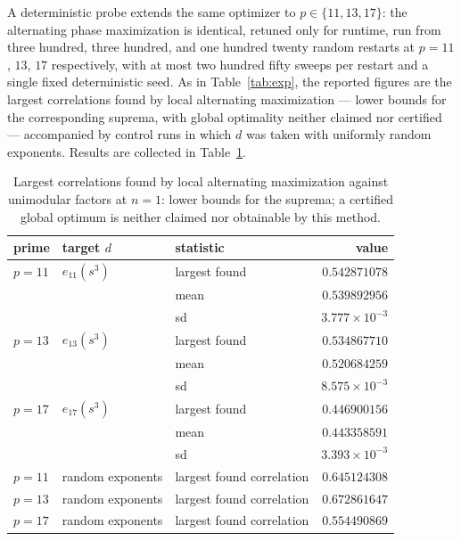 \documentclass[11pt]{article}
\theoremstyle{remark}
\begin{document}
A deterministic probe extends the same optimizer to $p\in\{11,13,17\}$: the
alternating phase maximization is identical, retuned only for runtime, run
from three hundred, three hundred, and one hundred twenty random restarts at
$p=11$, $13$, $17$ respectively, with at most two hundred fifty sweeps per
restart and a single fixed deterministic seed. As in Table~\ref{tab:exp},
the reported figures are the largest correlations found by local alternating
maximization — lower bounds for the corresponding suprema, with global
optimality neither claimed nor certified — accompanied by control runs in
which $d$ was taken with uniformly random exponents. Results are collected
in Table~\ref{tab:probe}.

\begin{table}[ht]
\centering
\small
\begin{tabular}{lllr}
\toprule
prime & target $d$ & statistic & value \\
\midrule
$p=11$ & $e_{11}(s^{3})$ & largest found & $0.542871078$ \\
       &                 & mean          & $0.539892956$ \\
       &                 & sd            & $3.777\times10^{-3}$ \\
$p=13$ & $e_{13}(s^{3})$ & largest found & $0.534867710$ \\
       &                 & mean          & $0.520684259$ \\
       &                 & sd            & $8.575\times10^{-3}$ \\
$p=17$ & $e_{17}(s^{3})$ & largest found & $0.446900156$ \\
       &                 & mean          & $0.443358591$ \\
       &                 & sd            & $3.393\times10^{-3}$ \\
\midrule
$p=11$ & random exponents & largest found correlation & $0.645124308$ \\
$p=13$ & random exponents & largest found correlation & $0.672861647$ \\
$p=17$ & random exponents & largest found correlation & $0.554490869$ \\
\bottomrule
\end{tabular}
\caption{Largest correlations found by local alternating maximization against
unimodular factors at $n=1$: lower bounds for the suprema; a certified global
optimum is neither claimed nor obtainable by this method.}
\label{tab:probe}
\end{table}
\end{document}
